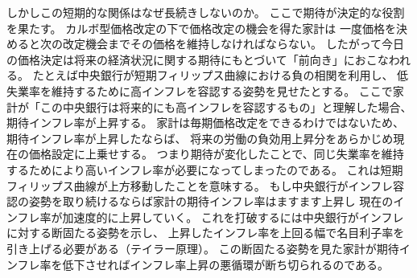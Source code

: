 しかしこの短期的な関係はなぜ長続きしないのか。
ここで期待が決定的な役割を果たす。
カルボ型価格改定の下で価格改定の機会を得た家計は
一度価格を決めると次の改定機会までその価格を維持しなければならない。
したがって今日の価格決定は将来の経済状況に関する期待にもとづいて「前向き」におこなわれる。
たとえば中央銀行が短期フィリップス曲線における負の相関を利用し、
低失業率を維持するために高インフレを容認する姿勢を見せたとする。
ここで家計が「この中央銀行は将来的にも高インフレを容認するもの」と理解した場合、期待インフレ率が上昇する。
家計は毎期価格改定をできるわけではないため、期待インフレ率が上昇したならば、
将来の労働の負効用上昇分をあらかじめ現在の価格設定に上乗せする。
つまり期待が変化したことで、同じ失業率を維持するためにより高いインフレ率が必要になってしまったのである。
これは短期フィリップス曲線が上方移動したことを意味する。
もし中央銀行がインフレ容認の姿勢を取り続けるならば家計の期待インフレ率はますます上昇し
現在のインフレ率が加速度的に上昇していく。
これを打破するには中央銀行がインフレに対する断固たる姿勢を示し、
上昇したインフレ率を上回る幅で名目利子率を引き上げる必要がある（テイラー原理）。
この断固たる姿勢を見た家計が期待インフレ率を低下させればインフレ率上昇の悪循環が断ち切られるのである。


